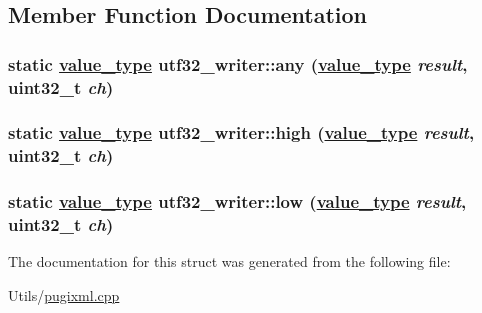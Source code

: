 \subsection{Member Function Documentation}
\hypertarget{structutf32__writer_a94aaa4a13e755942e7da70ea7700d3e}{
\subsubsection[any]{\setlength{\rightskip}{0pt plus 5cm}static \hyperlink{structutf32__writer_2284e1fa3406f113f151ded2aaa8d4ae}{value\_\-type} utf32\_\-writer::any (\hyperlink{structutf32__writer_2284e1fa3406f113f151ded2aaa8d4ae}{value\_\-type} {\em result}, uint32\_\-t {\em ch})}}
\label{structutf32__writer_a94aaa4a13e755942e7da70ea7700d3e}


\hypertarget{structutf32__writer_3f86d996cde3ed7cab5c31930b67c9f1}{
\subsubsection[high]{\setlength{\rightskip}{0pt plus 5cm}static \hyperlink{structutf32__writer_2284e1fa3406f113f151ded2aaa8d4ae}{value\_\-type} utf32\_\-writer::high (\hyperlink{structutf32__writer_2284e1fa3406f113f151ded2aaa8d4ae}{value\_\-type} {\em result}, uint32\_\-t {\em ch})}}
\label{structutf32__writer_3f86d996cde3ed7cab5c31930b67c9f1}


\hypertarget{structutf32__writer_06e1b65906f7355ea54a622248095bc7}{
\subsubsection[low]{\setlength{\rightskip}{0pt plus 5cm}static \hyperlink{structutf32__writer_2284e1fa3406f113f151ded2aaa8d4ae}{value\_\-type} utf32\_\-writer::low (\hyperlink{structutf32__writer_2284e1fa3406f113f151ded2aaa8d4ae}{value\_\-type} {\em result}, uint32\_\-t {\em ch})}}
\label{structutf32__writer_06e1b65906f7355ea54a622248095bc7}




The documentation for this struct was generated from the following file:\begin{CompactItemize}
\item 
Utils/\hyperlink{pugixml_8cpp}{pugixml.cpp}\end{CompactItemize}

